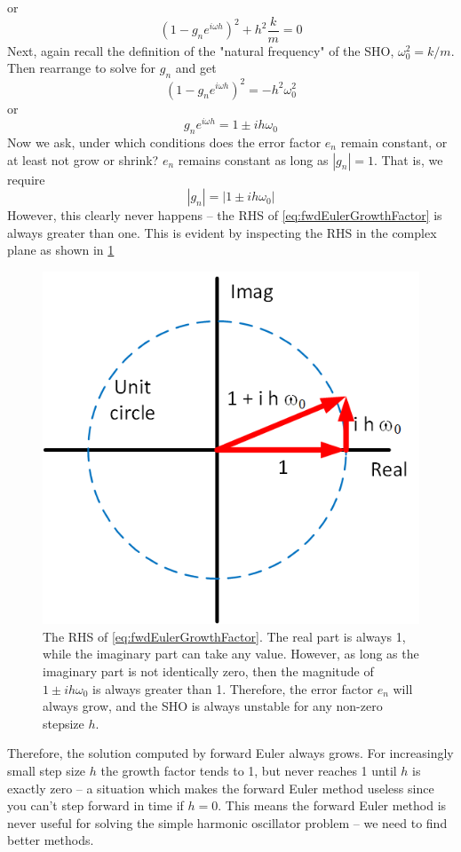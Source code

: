 \documentclass[hidelinks,notitlepage]{book}
\begin{document}
or
\begin{equation}
\nonumber
(1 - g_n e^{i \omega h})^2  + h^2 \frac{k}{m} 
= 0
\end{equation}
Next, again recall the definition of the "natural frequency" of the SHO, $\omega_0^2 = k/m$.  Then rearrange to solve for $g_n$ and get
\begin{equation}
\nonumber
(1 - g_n e^{i \omega h})^2 = -h^2 \omega_0^2 
\end{equation}
or
\begin{equation}
\nonumber
g_n e^{i \omega h} = 1 \pm i h \omega_0
\end{equation}
Now we ask, under which conditions does the error factor $e_n$ remain constant, or at least not grow or shrink?  $e_n$ remains constant as long as $|g_n| = 1$.  That is, we require
\begin{equation}
\label{eq:fwdEulerGrowthFactor}
|g_n| = \left| 1 \pm i h \omega_0 \right|
\end{equation}
However, this clearly never happens -- the RHS of \cref{eq:fwdEulerGrowthFactor} is always greater than one.  This is evident by inspecting the RHS in the complex plane as shown in \cref{fig:ForwardEulerSHOComplexPlane}
\begin{figure}[tbh]
	\centering
	\includegraphics[width=0.5\columnwidth]{ForwardEulerSHOComplexPlane.png}
	\caption{The RHS of \cref{eq:fwdEulerGrowthFactor}.  The real part is always 1, while the imaginary part can take any value.  However, as long as the imaginary part is not identically zero, then the magnitude of $1 \pm i h \omega_0$ is always greater than 1.  Therefore, the error factor $e_n$ will always grow, and the SHO is always unstable for any non-zero stepsize $h$.}
	\label{fig:ForwardEulerSHOComplexPlane}
\end{figure}
Therefore, the solution computed by forward Euler always grows.  For increasingly small step size $h$ the growth factor tends to 1, but never reaches 1 until $h$ is exactly zero -- a situation which makes the forward Euler method useless since you can't step forward in time if $h = 0$.  This means the forward Euler method is never useful for solving the simple harmonic oscillator problem -- we need to find better methods.
\end{document}
